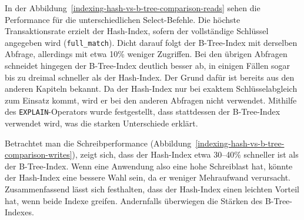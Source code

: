 In der Abbildung~\ref{indexing-hash-vs-b-tree-comparison-reads} sehen die Performance für die unterschiedlichen Select-Befehle.
Die höchste Transaktionsrate erzielt der Hash-Index, sofern der vollständige Schlüssel angegeben wird (\texttt{full\_match}).
Dicht darauf folgt der B-Tree-Index mit derselben Abfrage, allerdings mit etwa 10\% weniger Zugriffen.
Bei den übrigen Abfragen schneidet hingegen der B-Tree-Index deutlich besser ab, in einigen Fällen sogar bis zu dreimal schneller als der Hash-Index.
Der Grund dafür ist bereits aus den anderen Kapiteln bekannt.
Da der Hash-Index nur bei exaktem Schlüsselabgleich zum Einsatz kommt, wird er bei den anderen Abfragen nicht verwendet.
Mithilfe des \texttt{EXPLAIN}-Operators wurde festgestellt, dass stattdessen der B-Tree-Index verwendet wird, was die starken Unterschiede erklärt.

Betrachtet man die Schreibperformance (Abbildung~\ref{indexing-hash-vs-b-tree-comparison-writes}), zeigt sich, dass der Hash-Index etwa 30--40\% schneller ist als der B-Tree-Index.
Wenn eine Anwendung also eine hohe Schreiblast hat, könnte der Hash-Index eine bessere Wahl sein, da er weniger Mehraufwand verursacht.
Zusammenfassend lässt sich festhalten, dass der Hash-Index einen leichten Vorteil hat, wenn beide Indexe greifen.
Andernfalls überwiegen die Stärken des B-Tree-Indexes.
